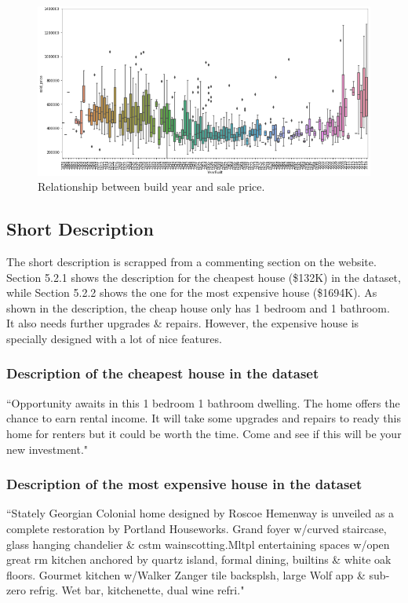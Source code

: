 \documentclass{article} %
\begin{document}
\begin{figure}[H]
	\begin{center}
		\includegraphics[width=0.8\linewidth]{fig/build_year.png}
	\end{center}
	\caption{Relationship between build year and sale price.}
	\label{fig:long}
	\label{fig:onecol}
\end{figure}

\subsection{Short Description}

The short description is scrapped from a commenting section on the website.
Section 5.2.1 shows the description for the cheapest house (\$132K) in the dataset,
while Section 5.2.2 shows the one for the most expensive house (\$1694K).
As shown in the description, the cheap house only has 1 bedroom and 1 bathroom.
It also needs further upgrades \& repairs.
However, the expensive house is specially designed with a lot of nice features.

\subsubsection{Description of the cheapest house in the dataset}

``Opportunity awaits in this 1 bedroom 1 bathroom dwelling. The home offers the chance to earn rental income. It will take some upgrades and repairs to ready this home for renters but it could be worth the time. Come and see if this will be your new investment."

\subsubsection{Description of the most expensive house in the dataset}

``Stately Georgian Colonial home designed by Roscoe Hemenway is unveiled as a complete restoration by Portland Houseworks. Grand foyer w/curved staircase, glass hanging chandelier \& cstm wainscotting.Mltpl entertaining spaces w/open great rm kitchen anchored by quartz island, formal dining, builtins \& white oak floors. Gourmet kitchen w/Walker Zanger tile backsplsh, large Wolf app \& sub-zero refrig. Wet bar, kitchenette, dual wine refri."
\end{document}
